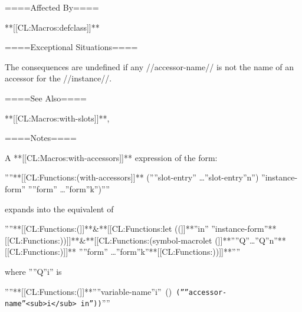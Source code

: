 ====Affected By====

**[[CL:Macros:defclass]]**

====Exceptional Situations====

The consequences are undefined if any //accessor-name// is not the name of an accessor for the //instance//.

====See Also====

**[[CL:Macros:with-slots]]**, 

====Notes====

A **[[CL:Macros:with-accessors]]** expression of the form:

''''\jot\vbox{\settabs\+\cr \+**[[CL:Functions:(with-accessors]]** (''{''slot-entry''} \ldots{''slot-entry''}\sub n'') ''instance-form'' ''{''form''} \ldots{''form''}\sub k'')\cr}''''

\noindent expands into the equivalent of

''''\jot\vbox{\settabs\+\cr \+**[[CL:Functions:(]]**&**[[CL:Functions:let ((]]**''in'' ''instance-form''**[[CL:Functions:))]]**\cr \+&**[[CL:Functions:(symbol-macrolet (]]**''{''Q''}\ldots {''Q''}\sub n''**[[CL:Functions:)]]** ''{''form''} \ldots{''form''}\sub k''**[[CL:Functions:))]]**\cr}''''

\noindent where ''{''Q''}\sub i'' is

''''{\vbox{\hbox{**[[CL:Functions:(]]**''{''variable-name''}\sub i'' () {\tt (''{''accessor-name''}<sub>i</sub>\ in''))}}}}''''

